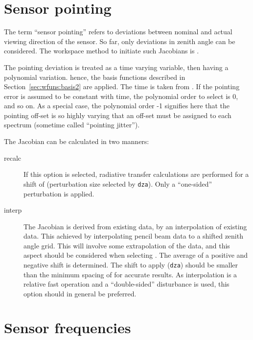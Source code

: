 \section{Sensor pointing}
\label{sec:wfuns:sensorpointing}

The term ``sensor pointing'' refers to deviations between nominal and
actual viewing direction of the sensor. So far, only deviations in zenith angle
can be considered. The workspace method to initiate such Jacobians is
.

The pointing deviation is treated as a time varying variable, then having a
polynomial variation. hence, the basis functions described in
Section~\ref{sec:wfuns:basis2} are applied. The time is taken from
. If the pointing error is assumed to be constant with
time, the polynomial order to select is 0, and so on. As a special case, the
polynomial order -1 signifies here that the pointing off-set is so highly
varying that an off-set must be assigned to each spectrum
(sometime called ``pointing jitter'').

The Jacobian can be calculated in two manners:
\begin{description}
\item[recalc] If this option is selected, radiative transfer calculations are
  performed for a shift of  (perturbation size selected
  by \verb|dza|). Only a ``one-sided'' perturbation is applied.
\item[interp] The Jacobian is derived from existing data, by an interpolation
  of existing data. This achieved by interpolating pencil beam data to a
  shifted zenith angle grid. This will involve some extrapolation of the data,
  and this aspect should be considered when selecting
  . The average of a positive and negative shift
  is determined. The shift to apply (\verb|dza|) should be smaller than the
  minimum spacing of  for accurate results. As
  interpolation is a relative fast operation and a ``double-sided'' disturbance
  is used, this option should in general be preferred.
\end{description}




\section{Sensor frequencies}
\label{sec:wfuns:sensorfreq}

